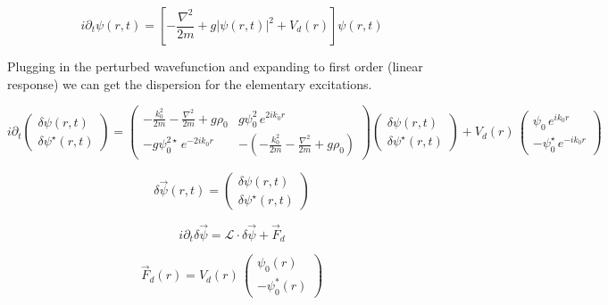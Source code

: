 \documentclass[a4paper,prb,10pt,aps]{revtex4-1}
\begin{document}
\begin{equation}
  \label{eq:13}
i\partial_{t}\psi(r,t)=\left[-\frac{\nabla^{2}}{2m}+g\left|\psi(r,t)\right|^{2}+V_{d}(r)\right]\psi(r,t)  
\end{equation}




Plugging in the perturbed wavefunction and expanding to first order (linear response) we can get the dispersion for the elementary excitations. 

\begin{equation}
  \label{eq:14}
i\partial_{t}\left(\begin{array}{c}
\delta\psi(r,t)\\
\delta\psi^{\star}(r,t)
\end{array}\right)=\left(\begin{array}{cc}
-\frac{k_{0}^{2}}{2m}-\frac{\nabla^{2}}{2m}+g\rho_{0} & g\psi_{0}^{2}\, e^{2ik_{0}r}\\
-g\psi_{0}^{2\star}\, e^{-2ik_{0}r} & -\left(-\frac{k_{0}^{2}}{2m}-\frac{\nabla^{2}}{2m}+g\rho_{0}\right)
\end{array}\right)\left(\begin{array}{c}
\delta\psi(r,t)\\
\delta\psi^{\star}(r,t)
\end{array}\right)+V_{d}(r)\,\left(\begin{array}{c}
\psi_{0}\, e^{ik_{0}r}\\
-\psi_{0}^{\star}\, e^{-ik_{0}r}
\end{array}\right)
\end{equation}


\begin{equation}
  \label{eq:15}
\delta\vec{\psi}(r,t)=\left(\begin{array}{c}
\delta\psi(r,t)\\
\delta\psi^{\star}(r,t)
\end{array}\right)
\end{equation}



\begin{equation}
  \label{eq:16}
i\partial_{t}\delta\vec{\psi}=\mathcal{L}\cdot\delta\vec{\psi}+\vec{F}_{d}  
\end{equation}


\begin{equation}
  \label{eq:17}
\vec{F}_{d}(r)=V_{d}(r)\,\left(\begin{array}{c}
\psi_{0}(r)\\
-\psi_{0}^{*}(r)
\end{array}\right)
\end{equation}
\end{document}
